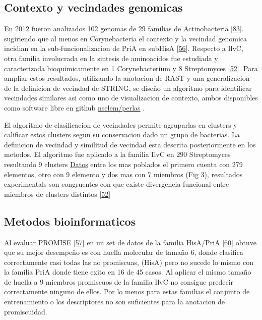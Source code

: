 \documentclass[12pt,twoside]{reedthesis}
\begin{document}
  \subsection{Contexto y vecindades
  genomicas}\label{contexto-y-vecindades-genomicas}
  
  En 2012 fueron analizados 102 genomas de 29 familias de Actinobacteria
  {[}\protect\hyperlink{ref-noda_estudio_2012}{83}{]}. sugiriendo que al
  menos en Corynebacteria el contexto y la vecindad genomica incidian en
  la sub-funcionalizacion de PriA en subHisA
  {[}\protect\hyperlink{ref-noda-garcia_evolution_2013}{56}{]}. Respecto a
  IlvC, otra familia involucrada en la sintesis de aminoacidos fue
  estudiada y caracterizada bioquimicamente en 1 Corynebacterium y 8
  Streptomyces
  {[}\protect\hyperlink{ref-verdel-aranda_molecular_2015}{52}{]}. Para
  ampliar estos resultados, utilizando la anotacion de RAST y una
  generalizacion de la definicion de vecindad de STRING, se diseño un
  algoritmo para identificar vecindades similares asi como uno de
  visualizacion de contexto, ambos disponibles como software libre en
  github \href{https://github.com/nselem/perlas}{nselem/perlas} .
  
  El algoritmo de clasificacion de vecindades permite agruparlas en
  clusters y calificar estos clusters segun su conservacion dado un grupo
  de bacterias. La definicion de vecindad y similitud de vecindad esta
  descrita posteriormente en los metodos. El algoritmo fue aplicado a la
  familia IlvC en 290 Streptomyces resultando 9 clusters
  \href{http://148.247.230.43/nselem/CONTEXTS/REL_St275/ilvC/Contextos.php}{Datos}
  entre los mas poblados el primero cuenta con 279 elementos, otro con 9
  elemento y dos mas con 7 miembros (Fig 3), resultados experimentals son
  congruentes con que existe divergencia funcional entre miembros de
  clusters distintos
  {[}\protect\hyperlink{ref-verdel-aranda_molecular_2015}{52}{]}
  
  \subsection{Metodos bioinformaticos}\label{metodos-bioinformaticos}
  
  Al evaluar PROMISE
  {[}\protect\hyperlink{ref-carbonell_molecular_2010}{57}{]} en un set de
  datos de la familia HisA/PriA
  {[}\protect\hyperlink{ref-noda-garcia_insights_2015}{60}{]} obtuve que
  su mejor desempeño es con huella molecular de tamaño 6, donde clasifica
  correctamente casi todas las no promiscuas, (HisA) pero no sucede lo
  mismo con la familia PriA donde tiene exito en 16 de 45 casos. Al
  aplicar el mismo tamaño de huella a 9 miembros promiscuos de la familia
  IlvC no consigue predecir correctamente ninguno de ellos. Por lo menos
  para estas familias el conjunto de entrenamiento o los descriptores no
  son suficientes para la anotacion de promiscuidad.
  
\end{document}
